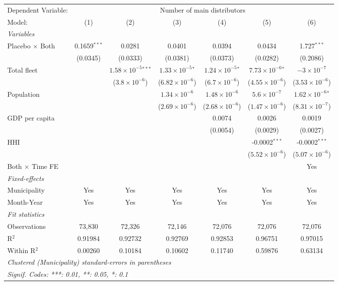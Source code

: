 \documentclass[
]{article}
\begin{document}
\begin{tabular}{lcccccc}
\tabularnewline\midrule\midrule
Dependent Variable:&\multicolumn{6}{c}{Number of main distributors}\\
Model:&(1) & (2) & (3) & (4) & (5) & (6)\\
\midrule \emph{Variables}&   &   &   &   &   &  \\
Placebo $\times $ Both & 0.1659$^{***}$ & 0.0281 & 0.0401 & 0.0394 & 0.0434 & 1.727$^{***}$\\
  &(0.0345) & (0.0333) & (0.0381) & (0.0373) & (0.0282) & (0.2086)\\
Total fleet &    & $1.58\times 10^{-5}$$^{***}$ & $1.33\times 10^{-5}$$^{*}$ & $1.24\times 10^{-5}$$^{*}$ & $7.73\times 10^{-6}$$^{*}$ & $-3\times 10^{-7}$\\
  &   & ($3.8\times 10^{-6}$) & ($6.82\times 10^{-6}$) & ($6.7\times 10^{-6}$) & ($4.55\times 10^{-6}$) & ($3.53\times 10^{-6}$)\\
Population &    &    & $1.34\times 10^{-6}$ & $1.48\times 10^{-6}$ & $5.6\times 10^{-7}$ & $1.62\times 10^{-6}$$^{*}$\\
  &   &    & ($2.69\times 10^{-6}$) & ($2.68\times 10^{-6}$) & ($1.47\times 10^{-6}$) & ($8.31\times 10^{-7}$)\\
GDP per capita &    &    &    & 0.0074 & 0.0026 & 0.0019\\
  &   &    &    & (0.0054) & (0.0029) & (0.0027)\\
HHI &    &    &    &    & -0.0002$^{***}$ & -0.0002$^{***}$\\
  &   &    &    &    & ($5.52\times 10^{-6}$) & ($5.07\times 10^{-6}$)\\
Both $\times$ Time FE &  &  &  &  &  & Yes\\
\midrule \emph{Fixed-effects}&   &   &   &   &   &  \\
Municipality & Yes & Yes & Yes & Yes & Yes & Yes\\
Month-Year & Yes & Yes & Yes & Yes & Yes & Yes\\
\midrule \emph{Fit statistics}&  & & & & & \\
Observations & 73,830&72,326&72,146&72,076&72,076&72,076\\
R$^2$ & 0.91984&0.92732&0.92769&0.92853&0.96751&0.97015\\
Within R$^2$ & 0.00260&0.10184&0.10602&0.11740&0.59876&0.63134\\
\midrule\midrule\multicolumn{7}{l}{\emph{Clustered (Municipality) standard-errors in parentheses}}\\
\multicolumn{7}{l}{\emph{Signif. Codes: ***: 0.01, **: 0.05, *: 0.1}}\\
\end{tabular}
\end{document}
